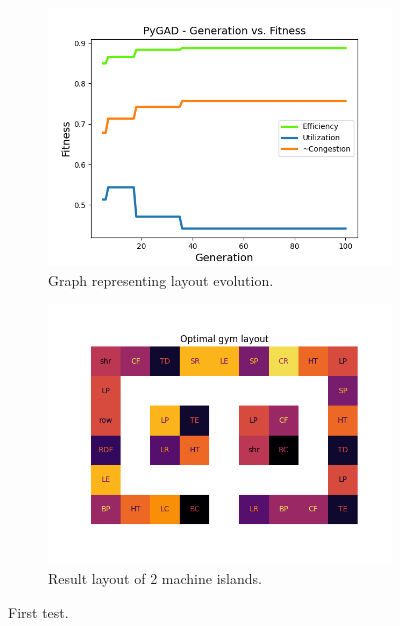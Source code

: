 \documentclass[9pt]{pnas-new}
\begin{document}
\begin{figure}[H]
	\begin{subfigure}{0.495\linewidth}
        \centering
        \includegraphics[width=\textwidth]{fitness_1.png}
        \caption{Graph representing layout evolution.}\label{fig:fitness_1}
    \end{subfigure}
    \begin{subfigure}{0.495\linewidth}
        \centering
        \includegraphics[width=\textwidth]{layout_1.png}
        \caption{Result layout of 2 machine islands.}\label{fig:layout_1}
    \end{subfigure}
    \caption{First test.}\label{fig:firstTest}
\end{figure}
\end{document}
